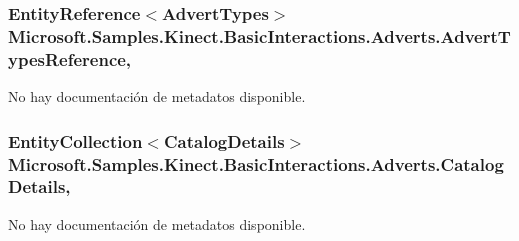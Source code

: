 \hypertarget{class_microsoft_1_1_samples_1_1_kinect_1_1_basic_interactions_1_1_adverts_a025e83eea34d835ee1b1996e2829b62c}{
\subsubsection[{Advert\-Types\-Reference}]{\setlength{\rightskip}{0pt plus 5cm}Entity\-Reference$<${\bf Advert\-Types}$>$ Microsoft.\-Samples.\-Kinect.\-Basic\-Interactions.\-Adverts.\-Advert\-Types\-Reference\hspace{0.3cm}{\ttfamily [get]}, {\ttfamily [set]}}}\label{class_microsoft_1_1_samples_1_1_kinect_1_1_basic_interactions_1_1_adverts_a025e83eea34d835ee1b1996e2829b62c}


No hay documentación de metadatos disponible. 

\hypertarget{class_microsoft_1_1_samples_1_1_kinect_1_1_basic_interactions_1_1_adverts_a7de65ee5067d3073f8358c5de9e75c2f}{
\subsubsection[{Catalog\-Details}]{\setlength{\rightskip}{0pt plus 5cm}Entity\-Collection$<${\bf Catalog\-Details}$>$ Microsoft.\-Samples.\-Kinect.\-Basic\-Interactions.\-Adverts.\-Catalog\-Details\hspace{0.3cm}{\ttfamily [get]}, {\ttfamily [set]}}}\label{class_microsoft_1_1_samples_1_1_kinect_1_1_basic_interactions_1_1_adverts_a7de65ee5067d3073f8358c5de9e75c2f}


No hay documentación de metadatos disponible. 

